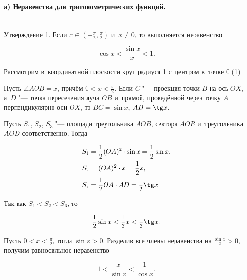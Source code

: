 
\paragraph{а) Неравенства для тригонометрических функций.}\mbox{} \\

Утверждение 1.\label{st:4_3_2_1}
Если $\displaystyle  x \in \left( -\frac{\pi}{2}, \frac{\pi}{2} \right)$
и~$x \ne 0$, то выполняется неравенство

\begin{equation}\label{eq:4_3_2_1}
\displaystyle \cos x < \frac{\sin x}{x} < 1.
\end{equation}

Рассмотрим в~координатной плоскости круг радиуса 1 с~центром в~точке $0$
(\ref{fig:4_3_2_10})

\begin{figure}\label{fig:4_3_2_10}
\end{figure}

Пусть $\angle AOB = x$, причём $\displaystyle 0 < x < \frac{\pi}{2}$.
Если $C$ "--- проекция точки $B$ на ось $OX$, а~$D$ "--- точка пересечения луча $OB$ 
и~прямой, проведённой через точку $A$ перпендикулярно оси $OX$,
то $BC = \sin x$, $AD = \tg x$.

Пусть $S_{1}$, $S_{2}$, $S_{3}$ "--- площади треугольника $AOB$, сектора $AOB$
и~треугольника $AOD$ соответственно. Тогда

\begin{align}
& \displaystyle S_{1} = \frac{1}{2}(OA)^{2} \cdot \sin x = \frac{1}{2} \sin x, \\
& \displaystyle S_{2} = (OA)^{2} \cdot x = \frac{1}{2} x, \\
& \displaystyle S_{3} = \frac{1}{2} OA \cdot AD = \frac{1}{2} \tg x.
\end{align}

\noindent
Так как $S_{1} < S_{2} < S_{3}$, то

\begin{equation}\label{eq:4_3_2_2}
\displaystyle \frac{1}{2} \sin x < \frac{1}{2} x < \frac{1}{2} \tg x.
\end{equation}

\noindent
Пусть $\displaystyle 0 < x < \frac{\pi}{2}$, тогда $\sin x > 0$.
Разделив все члены неравенства на $\displaystyle \frac{\sin x}{2} > 0$,
получим равносильное неравенство

\begin{equation}\label{eq:4_3_2_3}
\displaystyle 1 < \frac{x}{\sin x} < \frac{1}{\cos x}.
\end{equation}


